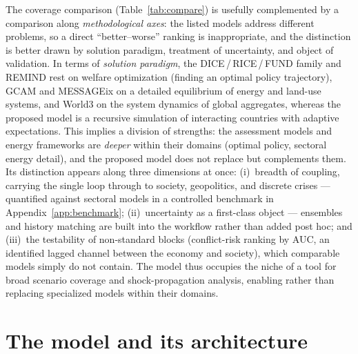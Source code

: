 \documentclass[a4paper,fleqn]{cas-sc}
\begin{document}
The coverage comparison (Table~\ref{tab:compare}) is usefully complemented by a comparison along
\emph{methodological axes}: the listed models address different problems, so a direct
``better--worse'' ranking is inappropriate, and the distinction is better drawn by solution
paradigm, treatment of uncertainty, and object of validation. In terms of \emph{solution paradigm},
the DICE\,/\,RICE\,/\,FUND family and REMIND rest on welfare optimization (finding an optimal policy
trajectory), GCAM and MESSAGEix on a detailed equilibrium of energy and land-use systems, and World3
on the system dynamics of global aggregates, whereas the proposed model is a recursive simulation of
interacting countries with adaptive expectations. This implies a division of strengths: the
assessment models and energy frameworks are \emph{deeper} within their domains (optimal policy,
sectoral energy detail), and the proposed model does not replace but complements them. Its distinction appears along three dimensions at once: {(i)}~breadth of coupling, carrying the single loop through to
society, geopolitics, and discrete crises --- quantified against sectoral models in a controlled
benchmark in Appendix~\ref{app:benchmark}; {(ii)}~uncertainty as a first-class object ---
ensembles and history matching are built into the workflow rather than added post hoc; and
{(iii)}~the testability of non-standard blocks (conflict-risk ranking by AUC, an identified
lagged channel between the economy and society), which comparable models simply do not contain. The
model thus occupies the niche of a tool for broad scenario coverage and shock-propagation analysis,
enabling rather than replacing specialized models within their domains.

\section{The model and its architecture}

\end{document}
